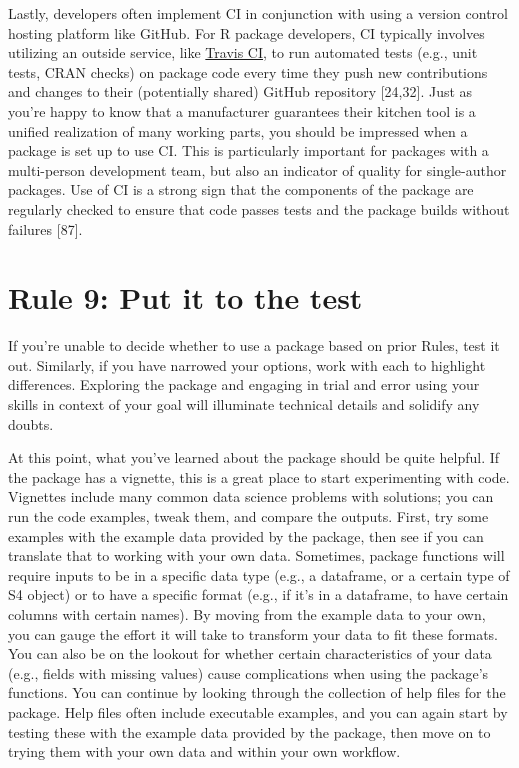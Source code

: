 \documentclass[10pt,letterpaper]{article}
\begin{document}
Lastly, developers often implement CI in conjunction with using a
version control hosting platform like GitHub. For R package developers,
CI typically involves utilizing an outside service, like
\href{https://travis-ci.org/}{Travis CI}, to run automated tests (e.g.,
unit tests, CRAN checks) on package code every time they push new
contributions and changes to their (potentially shared) GitHub
repository {[}24,32{]}. Just as you're happy to know that a manufacturer
guarantees their kitchen tool is a unified realization of many working
parts, you should be impressed when a package is set up to use CI. This
is particularly important for packages with a multi-person development
team, but also an indicator of quality for single-author packages. Use
of CI is a strong sign that the components of the package are regularly
checked to ensure that code passes tests and the package builds without
failures {[}87{]}.

\hypertarget{rule-9-put-it-to-the-test}{%
\section{Rule 9: Put it to the test}\label{rule-9-put-it-to-the-test}}

If you're unable to decide whether to use a package based on prior
Rules, test it out. Similarly, if you have narrowed your options, work
with each to highlight differences. Exploring the package and engaging
in trial and error using your skills in context of your goal will
illuminate technical details and solidify any doubts.

At this point, what you've learned about the package should be quite
helpful. If the package has a vignette, this is a great place to start
experimenting with code. Vignettes include many common data science
problems with solutions; you can run the code examples, tweak them, and
compare the outputs. First, try some examples with the example data
provided by the package, then see if you can translate that to working
with your own data. Sometimes, package functions will require inputs to
be in a specific data type (e.g., a dataframe, or a certain type of S4
object) or to have a specific format (e.g., if it's in a dataframe, to
have certain columns with certain names). By moving from the example
data to your own, you can gauge the effort it will take to transform
your data to fit these formats. You can also be on the lookout for
whether certain characteristics of your data (e.g., fields with missing
values) cause complications when using the package's functions. You can
continue by looking through the collection of help files for the
package. Help files often include executable examples, and you can again
start by testing these with the example data provided by the package,
then move on to trying them with your own data and within your own
workflow.
\end{document}
